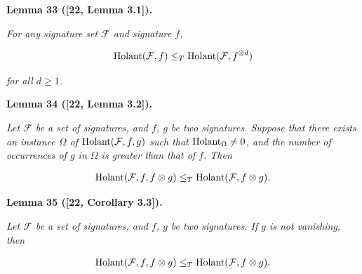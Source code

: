 \documentclass[10pt,a4paper]{article}
\begin{document}


\par\medskip\noindent\textbf{
\textbf{Lemma 33}\textbf{ }([22, Lemma 3.1])\textbf{.}
}\par



\emph{For any signature set $\mathcal{F}$ and signature $f$,}\par


\[\begin{gathered}
\textup{{Holant}}(\mathcal{F},f)\leq_{T}\textup{{Holant}}(\mathcal{F},f^{\otimes d})
\end{gathered}\]


\emph{for all $d\geq 1$.}\par







\par\medskip\noindent\textbf{
\textbf{Lemma 34}\textbf{ }([22, Lemma 3.2])\textbf{.}
}\par



\emph{Let $\mathcal{F}$ be a set of signatures, and $f$, $g$ be two signatures. Suppose that
there exists an instance $\Omega$ of $\textup{{Holant}}(\mathcal{F},f,g)$ such that $\textup{{Holant}}_{\Omega}\neq 0$, and the number
of occurrences of $g$ in $\Omega$ is greater than that of $f$. Then}\par


\[\begin{gathered}
\textup{{Holant}}(\mathcal{F},f,f\otimes g)\leq_{T}\textup{{Holant}}(\mathcal{F},f\otimes g).
\end{gathered}\]







\par\medskip\noindent\textbf{
\textbf{Lemma 35}\textbf{ }([22, Corollary 3.3])\textbf{.}
}\par



\emph{Let $\mathcal{F}$ be a set of signatures, and $f$, $g$ be two signatures. If $g$ is
not vanishing, then}\par


\[\begin{gathered}
\textup{{Holant}}(\mathcal{F},f,f\otimes g)\leq_{T}\textup{{Holant}}(\mathcal{F},f\otimes g).
\end{gathered}\]
\end{document}
